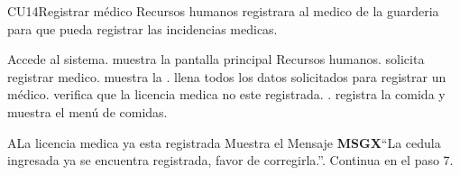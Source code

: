 
	\begin{UseCase}{CU14}{Registrar médico}{
		Recursos humanos registrara al medico de la guarderia para que pueda registrar las incidencias medicas.
	}
	\end{UseCase}
	\begin{UCtrayectoria}
		\UCpaso[\UCactor] Accede al sistema.
		\UCpaso muestra la pantalla principal Recursos humanos.
		\UCpaso[\UCactor] solicita registrar medico.
		\UCpaso muestra la  .
		\UCpaso[\UCactor] llena todos los datos solicitados para registrar un médico.
            \UCpaso verifica que la licencia medica no este registrada. .
		\UCpaso registra la comida y muestra el menú de comidas.
	\end{UCtrayectoria}

		\begin{UCtrayectoriaA}{A}{La licencia medica ya esta registrada}
			\UCpaso Muestra el Mensaje {\bf MSGX}``La cedula ingresada ya se encuentra registrada, favor de corregirla.''.
			\UCpaso Continua en el paso 7.
		\end{UCtrayectoriaA}
		
